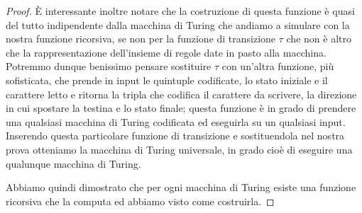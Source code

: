 \begin{proof}
È interessante inoltre notare che la costruzione di questa funzione è
quasi del tutto indipendente dalla macchina di Turing che andiamo a
simulare con la nostra funzione ricorsiva, se non per la funzione di
transizione $\tau$ che non è altro che la rappresentazione
dell'insieme di regole date in pasto alla macchina. Potremmo dunque
benissimo pensare sostituire $\tau$ con un'altra funzione, più
sofisticata, che prende in input le quintuple codificate, lo stato
iniziale e il carattere letto e ritorna la tripla che codifica il
carattere da scrivere, la direzione in cui spostare la testina e lo
stato finale; questa funzione è in grado di prendere una qualsiasi
macchina di Turing codificata ed eseguirla su un qualsiasi
input. Inserendo questa particolare funzione di transizione e
sostituendola nel nostra prova otteniamo la macchina di Turing
universale, in grado cioè di eseguire una qualunque macchina di
Turing.

Abbiamo quindi dimostrato che per ogni macchina di Turing esiste una funzione
ricorsiva che la computa ed abbiamo visto come costruirla.
\end{proof}


